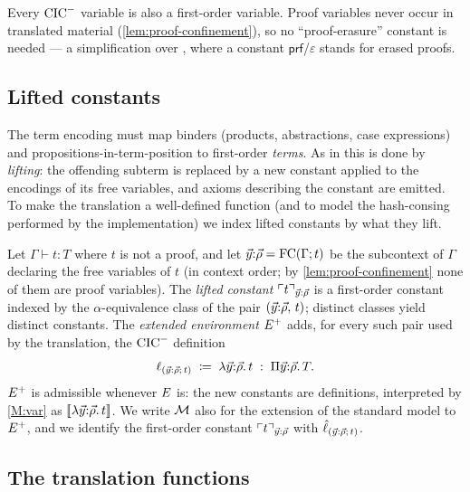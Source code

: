 \begin{convention}
Every $\mathrm{CIC}^{-}$ variable is also a first-order variable.  Proof
variables never occur in translated material
(\cref{lem:proof-confinement}), so no ``proof-erasure'' constant is
needed --- a simplification over \cite{CzajkaKaliszyk2018,
Czajka2016}, where a constant $\mathsf{prf}$/$\varepsilon$ stands
for erased proofs.
\end{convention}

\subsection{Lifted constants}

The term encoding must map binders (products, abstractions, case
expressions) and propositions-in-term-position to first-order
\emph{terms}.  As in \cite{CzajkaKaliszyk2018,Czajka2016} this is
done by \emph{lifting}: the offending subterm is replaced by a new
constant applied to the encodings of its free variables, and axioms
describing the constant are emitted.  To make the translation a
well-defined function (and to model the hash-consing performed by
the implementation) we index lifted constants by what they lift.

\begin{definition}
\label{def:lifted}
Let $\Gamma \vdash t : T$ where $t$ is not a proof, and let
$\vec{y}{:}\vec{\rho} = \mathrm{FC}(\Gamma; t)$ be the subcontext of
$\Gamma$ declaring the free variables of $t$ (in context order;
by \cref{lem:proof-confinement} none of them are proof variables).
The \emph{lifted constant} $\ulcorner t \urcorner_{\vec{y}:\vec{\rho}}$ is a
first-order constant indexed by the $\alpha$-equivalence class of
the pair $(\vec{y}{:}\vec{\rho},\, t)$; distinct classes yield
distinct constants.  The \emph{extended environment} $E^{+}$
adds, for every such pair used by the translation, the $\mathrm{CIC}^{-}$
definition
\[
  \ell_{(\vec{y}:\vec{\rho};\, t)} \;\coloneqq\; \lambda
  \vec{y}{:}\vec{\rho}.\, t \;:\; \Pi \vec{y}{:}\vec{\rho}.\, T .
\]
$E^{+}$ is admissible whenever $E$ is: the new constants are
definitions, interpreted by \ref{M:var} as
$[\![ \lambda\vec{y}{:}\vec{\rho}.\,t ]\!]$.  We write $\mathcal{M}$ also for the
extension of the standard model to $E^{+}$, and we identify the
first-order constant $\ulcorner t \urcorner_{\vec{y}:\vec{\rho}}$ with
$\hat{\ell}_{(\vec{y}:\vec{\rho};\,t)}$.
\end{definition}

\subsection{The translation functions}

